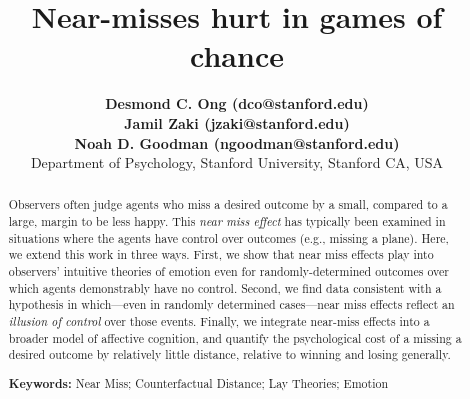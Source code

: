 \documentclass[10pt,letterpaper]{article}
\title{ Near-misses hurt in games of chance \red{fixme}}
\author{{\large \bf Desmond C. Ong (dco@stanford.edu)} \\
{\large \bf Jamil Zaki (jzaki@stanford.edu)} \\
{\large \bf Noah D. Goodman (ngoodman@stanford.edu)} \\
  Department of Psychology, Stanford University, Stanford CA, USA 
}
\begin{document}
\maketitle

\begin{abstract}
Observers often judge agents who miss a desired outcome by a small, compared to a large, margin to be less happy. This \textit{near miss effect} has typically been examined in situations where the agents have control over outcomes (e.g., missing a plane). Here, we extend this work in three ways.  First, we show that near miss effects play into observers' intuitive theories of emotion even for randomly-determined outcomes over which agents demonstrably have no control.  Second, we find data consistent with a hypothesis in which---even in randomly determined cases---near miss effects reflect an \textit{illusion of control} over those events. Finally, we integrate near-miss effects into a broader model of affective cognition, and quantify the psychological cost of a missing a desired outcome by relatively little distance, relative to winning and losing generally.




\textbf{Keywords:} 
Near Miss; Counterfactual Distance; Lay Theories; Emotion
\end{abstract}
\end{document}

